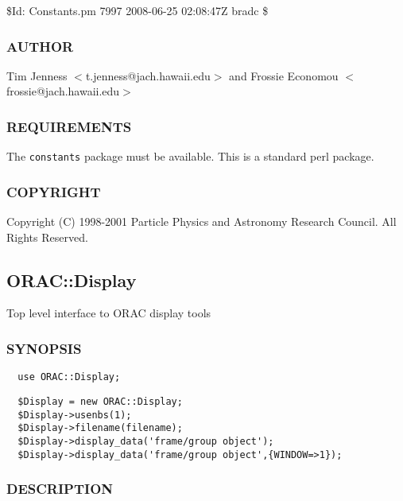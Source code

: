 \$Id: Constants.pm 7997 2008-06-25 02:08:47Z bradc \$

\subsubsection*{AUTHOR\label{ORAC::Constants_AUTHOR}}


Tim Jenness $<$t.jenness@jach.hawaii.edu$>$ and
Frossie Economou $<$frossie@jach.hawaii.edu$>$

\subsubsection*{REQUIREMENTS\label{ORAC::Constants_REQUIREMENTS}}


The \texttt{constants} package must be available. This is a standard
perl package.

\subsubsection*{COPYRIGHT\label{ORAC::Constants_COPYRIGHT}}


Copyright (C) 1998-2001 Particle Physics and Astronomy Research
Council. All Rights Reserved.

\subsection{ORAC::Display\label{ORAC::Display}}


Top level interface to ORAC display tools

\subsubsection*{SYNOPSIS\label{ORAC::Display_SYNOPSIS}}
\begin{verbatim}
  use ORAC::Display;
\end{verbatim}
\begin{verbatim}
  $Display = new ORAC::Display;
  $Display->usenbs(1);
  $Display->filename(filename);
  $Display->display_data('frame/group object');
  $Display->display_data('frame/group object',{WINDOW=>1});
\end{verbatim}
\subsubsection*{DESCRIPTION\label{ORAC::Display_DESCRIPTION}}


